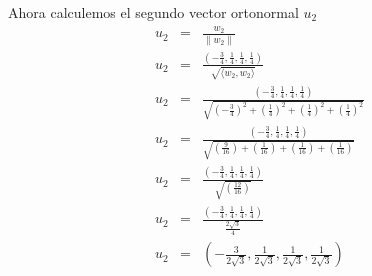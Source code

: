\begin{enumerate}
    Ahora calculemos el segundo vector ortonormal ${u}_{2}$
    \begin{eqnarray}
        {u}_{2} &=& \frac{{w}_{2}}{\|{w}_{2} \|} \nonumber \\
        {u}_{2} &=& \frac{\left(- \frac{3}{4}, \frac{1}{4}, \frac{1}{4}, \frac{1}{4} \right)}{\sqrt{\langle {w}_{2}, {w}_{2} \rangle}} \nonumber \\
        {u}_{2} &=& \frac{\left(- \frac{3}{4}, \frac{1}{4}, \frac{1}{4}, \frac{1}{4} \right)}{\sqrt{{\left(-\frac{3}{4} \right)}^{2}+{\left(\frac{1}{4} \right)}^{2}+{\left(\frac{1}{4} \right)}^{2}+{\left(\frac{1}{4} \right)}^{2}}} \nonumber \\
        {u}_{2} &=& \frac{\left(- \frac{3}{4}, \frac{1}{4}, \frac{1}{4}, \frac{1}{4} \right)}{\sqrt{\left(\frac{9}{16}\right) + \left(\frac{1}{16}\right) + \left(\frac{1}{16}\right) + \left(\frac{1}{16}\right) }} \nonumber \\
        {u}_{2} &=& \frac{\left(- \frac{3}{4}, \frac{1}{4}, \frac{1}{4}, \frac{1}{4} \right)}{\sqrt{\left( \frac{12}{16} \right) }} \nonumber \\
        {u}_{2} &=& \frac{\left(- \frac{3}{4}, \frac{1}{4}, \frac{1}{4}, \frac{1}{4} \right)}{\frac{2\sqrt{3}}{4}} \nonumber \\
        {u}_{2} &=& \left(- \frac{3}{2 \sqrt{3}}, \frac{1}{2 \sqrt{3}}, \frac{1}{2 \sqrt{3}}, \frac{1}{2 \sqrt{3}} \right) \nonumber
    \end{eqnarray}
\end{enumerate}